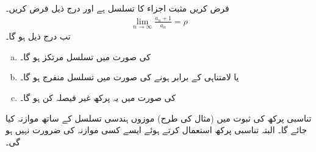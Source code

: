 \\
فرض کریں  مثبت اجزاء کا تسلسل ہے اور درج ذیل فرض کریں۔
\begin{align*}
\lim_{n\to\infty}\frac{a_n+1}{a_n}=\rho
\end{align*}
تب درج ذیل ہو گا۔
\begin{enumerate}[a.]
\item
{} کی صورت میں تسلسل مرتکز ہو گا۔
\item
{} یا لامتناہی کے برابر ہونے  کی صورت میں تسلسل منفرج ہو گا۔
\item
{} کی صورت میں یہ پرکھ غیر فیصلہ کن ہو گا۔
\end{enumerate}
تناسبی پرکھ کی ثبوت میں (مثال  کی طرح) موزوں ہندسی تسلسل کے ساتھ موازنہ کیا جائے گا۔ البتہ تناسبی پرکھ استعمال کرتے ہوئے ایسے کسی موازنہ کی ضرورت نہیں ہو گی۔
